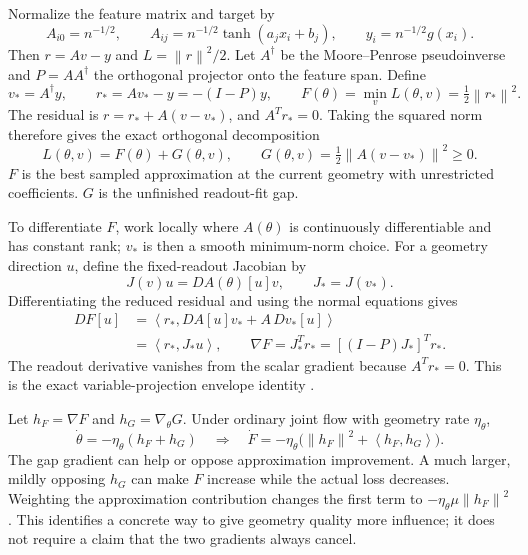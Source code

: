 \documentclass[11pt]{article}
\newcommand{\norm}[1]{\left\lVert#1\right\rVert}
\newcommand{\ip}[2]{\left\langle#1,#2\right\rangle}
\begin{document}
Normalize the feature matrix and target by
\begin{equation}
 A_{i0}=n^{-1/2},\qquad A_{ij}=n^{-1/2}\tanh(a_jx_i+b_j),
 \qquad y_i=n^{-1/2}g(x_i).
\end{equation}
Then $r=Av-y$ and $L=\norm{r}^2/2$. Let $A^\dagger$ be the Moore--Penrose pseudoinverse and $P=AA^\dagger$ the orthogonal projector onto the feature span. Define
\begin{equation}
 v_*=A^\dagger y,\qquad
 r_*=Av_*-y=-(I-P)y,\qquad
 F(\theta)=\min_vL(\theta,v)=\tfrac12\norm{r_*}^2.
\end{equation}
The residual is $r=r_*+A(v-v_*)$, and $A^Tr_*=0$. Taking the squared norm therefore gives the exact orthogonal decomposition
\begin{equation}
 \boxed{L(\theta,v)=F(\theta)+G(\theta,v),\qquad
 G(\theta,v)=\tfrac12\norm{A(v-v_*)}^2\geq0.}
 \label{eq:FG}
\end{equation}
$F$ is the best sampled approximation at the current geometry with unrestricted coefficients. $G$ is the unfinished readout-fit gap.

To differentiate $F$, work locally where $A(\theta)$ is continuously differentiable and has constant rank; $v_*$ is then a smooth minimum-norm choice. For a geometry direction $u$, define the fixed-readout Jacobian by
\begin{equation}
 J(v)u=DA(\theta)[u]v,\qquad J_*=J(v_*).
\end{equation}
Differentiating the reduced residual and using the normal equations gives
\begin{align}
 DF[u]
 &=\ip{r_*}{DA[u]v_*+A\,Dv_*[u]}\\
 &=\ip{r_*}{J_*u},\qquad
 \boxed{\nabla F=J_*^Tr_*=[(I-P)J_*]^Tr_*.}
 \label{eq:envelope}
\end{align}
The readout derivative vanishes from the scalar gradient because $A^Tr_*=0$. This is the exact variable-projection envelope identity \cite{handoff,projection}.

Let $h_F=\nabla F$ and $h_G=\nabla_\theta G$. Under ordinary joint flow with geometry rate $\eta_\theta$,
\begin{equation}
 \dot\theta=-\eta_\theta(h_F+h_G)
 \quad\Longrightarrow\quad
 \boxed{\dot F=-\eta_\theta\bigl(\norm{h_F}^2+\ip{h_F}{h_G}\bigr).}
 \label{eq:Fdot}
\end{equation}
The gap gradient can help or oppose approximation improvement. A much larger, mildly opposing $h_G$ can make $F$ increase while the actual loss decreases. Weighting the approximation contribution changes the first term to $-\eta_\theta\mu\norm{h_F}^2$. This identifies a concrete way to give geometry quality more influence; it does not require a claim that the two gradients always cancel.
\end{document}

